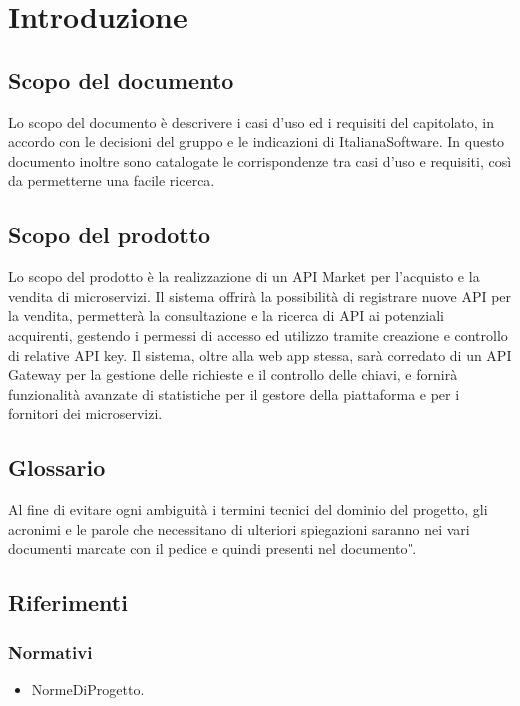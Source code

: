 \newpage
\section{Introduzione}

\subsection{Scopo del documento}
Lo scopo del documento è descrivere i casi d'uso ed i requisiti del capitolato, in accordo con le decisioni del gruppo e le indicazioni di ItalianaSoftware. In questo documento inoltre sono catalogate le corrispondenze tra casi d'uso e requisiti, così da permetterne una facile ricerca.
\subsection{Scopo del prodotto}
Lo scopo del prodotto è la realizzazione di un API Market per l'acquisto e la vendita di microservizi. Il sistema offrirà la possibilità di registrare nuove API per la vendita, permetterà la consultazione e la ricerca di API ai potenziali acquirenti, gestendo i permessi di accesso ed utilizzo tramite creazione e controllo di relative API key. Il sistema, oltre alla web app stessa, sarà corredato di un API Gateway per la gestione delle richieste e il controllo delle chiavi, e fornirà funzionalità avanzate di statistiche per il gestore della piattaforma e per i fornitori dei microservizi.

\subsection{Glossario}
Al fine di evitare ogni ambiguità i termini tecnici del dominio del progetto, gli acronimi e le parole che necessitano di ulteriori spiegazioni saranno nei vari documenti marcate con il pedice  e quindi presenti nel documento \textit{\G}.

\subsection{Riferimenti}

\subsubsection{Normativi}

\begin{itemize}
	
	\item NormeDiProgetto.
	
\end{itemize}

